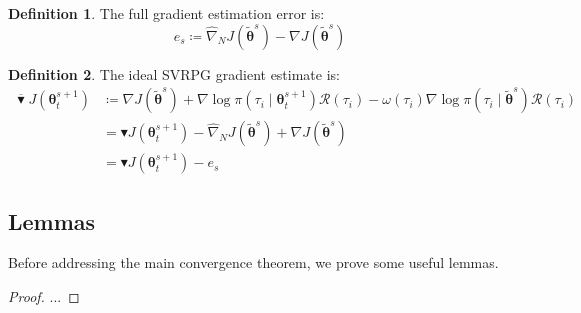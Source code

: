 \documentclass{article}
\theoremstyle{remark}
\theoremstyle{definition}
\newtheorem{definition}{Definition}[section]
\newcommand{\vtheta}{\boldsymbol{\theta}}
\newcommand{\Reward}{\mathcal{R}}
\newcommand{\gradJ}[1]{\nabla J(#1)}
\newcommand{\gradApp}[2]{\hat{\nabla}_{#2}J(#1)}
\newcommand{\gradBlack}[1]{\blacktriangledown J(#1)}
\begin{document}
\begin{definition}
The full gradient estimation error is:
\[
	e_s \coloneqq \gradApp{\tilde{\vtheta}^s}{N} - \gradJ{\tilde{\vtheta}^s} 
\]
\end{definition}

\begin{definition}\label{def:ideal}
The ideal SVRPG gradient estimate is:
\begin{align*}
	\overline{\blacktriangledown}J(\vtheta_t^{s+1}) &\coloneqq 
	\gradJ{\tilde{\vtheta}^s}
	+ \nabla\log\pi(\tau_i \mid \vtheta_t^{s+1})\Reward(\tau_i) 
	- \omega(\tau_i)\nabla\log\pi(\tau_i \mid \tilde{\vtheta}^s)\Reward(\tau_i) \\
	&= \gradBlack{\vtheta_t^{s+1}} - \gradApp{\tilde{\vtheta}^s}{N} + \gradJ{\tilde{\vtheta}^s} \\
	&= \gradBlack{\vtheta_t^{s+1}} - e_s
\end{align*}
\end{definition}


\subsection*{Lemmas}
Before addressing the main convergence theorem, we prove some useful lemmas.

\unbias*
\begin{proof}
...
\end{proof}
\end{document}
